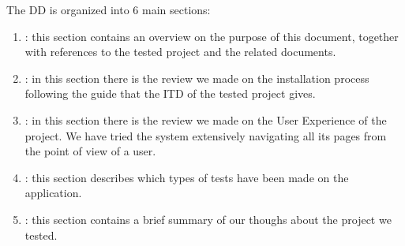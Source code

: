 The DD is organized into 6 main sections:

\begin{enumerate}
\item {\textbf{}}: this section contains an overview on the purpose of this document, together with references to the tested project and the related documents.
\item {\textbf{}}: in this section there is the review we made on the installation process following the guide that the ITD of the tested project gives. 
\item {\textbf{}}: in this section there is the review we made on the User Experience of the project. We have tried the system extensively navigating all its pages from the point of view of a user.
\item {\textbf{}}: this section describes which types of tests have been made on the application.
\item {\textbf{}}: this section contains a brief summary of our thoughs about the project we tested.
\end{enumerate}